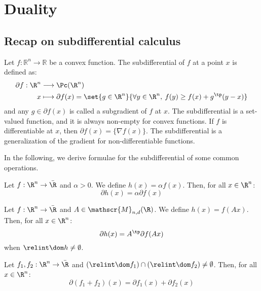 \section{Duality}
\subsection{Recap on subdifferential calculus}
Let $f:\mathbb{R}^n\to\mathbb{R}$ be a convex function. The subdifferential of $f$ at a point $x$ is defined as:
\begin{align*}
    \partial f : \R^n &\longrightarrow \Pc(\R^n)\\
    x &\longmapsto \partial f(x) = \set{g\in\R^n}{\forall y\in\R^n, \: f(y)\geq f(x)+g^\tp(y-x)}
\end{align*}
and any $g\in\partial f(x)$ is called a subgradient of $f$ at $x$. The subdifferential is a set-valued function, and it is always non-empty for convex functions. If $f$ is differentiable at $x$, then $\partial f(x) = \{\nabla f(x)\}$. The subdifferential is a generalization of the gradient for non-differentiable functions.

In the following, we derive formulae for the subdifferential of some common operations.

\begin{property}
    Let $f:\R^n\to\bar{\R}$ and $\alpha>0$. We define $h(x)=\alpha f(x)$. Then, for all $x\in\R^n$:
    \begin{equation*}
        \partial h(x) = \alpha\partial f(x)
    \end{equation*}
\end{property}

\begin{property}
    Let $f:\R^n\to\bar{\R}$ and $A\in\mathscr{M}_{n, d}(\R)$. We define $h(x)=f(Ax)$. Then, for all $x\in\R^n$:
    \begin{equation*}
        \partial h(x) = A^\tp\partial f(Ax)
    \end{equation*}
    when $\relint\dom h\neq\emptyset$.
\end{property}

\begin{property}$ $\\
    Let $f_1, f_2:\R^n\to\bar{\R}$ and $(\relint\dom f_1)\cap (\relint\dom f_2)\neq\emptyset$. Then, for all $x\in\R^n$:
    \begin{equation*}
        \partial(f_1+f_2)(x) = \partial f_1(x) + \partial f_2(x)
    \end{equation*}
\end{property}

